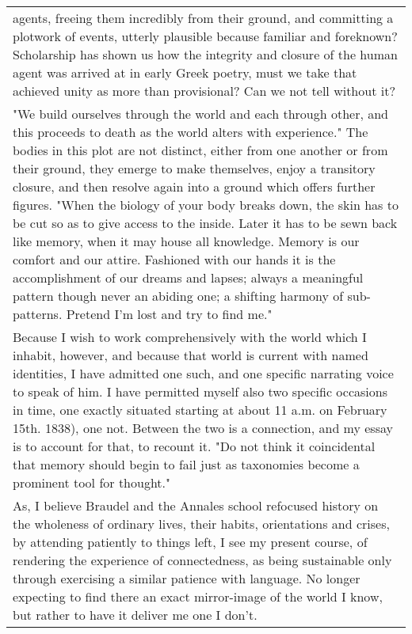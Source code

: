 \begin{longtable}[]{@{}l@{}}
\begin{minipage}[t]{0.97\columnwidth}
agents, freeing them incredibly from their ground, and committing a
plotwork of events, utterly plausible because familiar and foreknown?
Scholarship has shown us how the integrity and closure of the human
agent was arrived at in early Greek poetry, must we take that achieved
unity as more than provisional? Can we not tell without it?\strut
\end{minipage}\tabularnewline
\begin{minipage}[t]{0.97\columnwidth}\raggedright
"We build ourselves through the world and each through other, and this
proceeds to death as the world alters with experience." The bodies in
this plot are not distinct, either from one another or from their
ground, they emerge to make themselves, enjoy a transitory closure, and
then resolve again into a ground which offers further figures. "When the
biology of your body breaks down, the skin has to be cut so as to give
access to the inside. Later it has to be sewn back like memory, when it
may house all knowledge. Memory is our comfort and our attire. Fashioned
with our hands it is the accomplishment of our dreams and lapses; always
a meaningful pattern though never an abiding one; a shifting harmony of
sub-patterns. Pretend I'm lost and try to find me."\strut
\end{minipage}\tabularnewline
\begin{minipage}[t]{0.97\columnwidth}\raggedright
Because I wish to work comprehensively with the world which I inhabit,
however, and because that world is current with named identities, I have
admitted one such, and one specific narrating voice to speak of him. I
have permitted myself also two specific occasions in time, one exactly
situated starting at about 11 a.m. on February 15th. 1838), one not.
Between the two is a connection, and my essay is to account for that, to
recount it. "Do not think it coincidental that memory should begin to
fail just as taxonomies become a prominent tool for thought."\strut
\end{minipage}\tabularnewline
\begin{minipage}[t]{0.97\columnwidth}\raggedright
As, I believe Braudel and the Annales school refocused history on the
wholeness of ordinary lives, their habits, orientations and crises, by
attending patiently to things left, I see my present course, of
rendering the experience of connectedness, as being sustainable only
through exercising a similar patience with language. No longer expecting
to find there an exact mirror-image of the world I know, but rather to
have it deliver me one I don't.\strut

\end{minipage}
\end{longtable}
